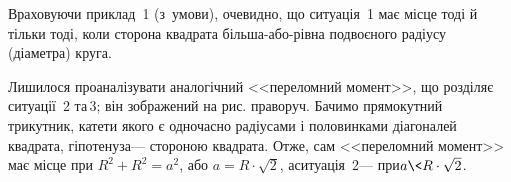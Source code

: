 \Tutorial	
Враховуючи приклад \textnumero$\,$1 (з~умови), очевидно, що ситуація \textnumero$\,$1 має місце тоді й тільки тоді, коли сторона квадрата більша-або-рівна подвоєного радіусу (діаметра) круга. 

Лишилося проаналізувати аналогічний <<переломний момент>>, що розділяє ситуації \textnumero$\,$2 та\nolinebreak[3] \textnumero$\,$3; він зображений на рис. праворуч.
Бачимо прямокутний трикутник, катети якого є одночасно радіусами і половинками діагоналей квадрата, гіпотенуза\nolinebreak[3] --- стороною квадрата. Отже, сам <<переломний момент>> має місце при ${R^2{+}R^2=a^2}$, або ${a=R\cdot\sqrt{2}}$, а\nolinebreak[3] ситуація \textnumero$\,$2\nolinebreak[3] --- при\nolinebreak[2] ${a\<R\cdot\sqrt{2}}$.

